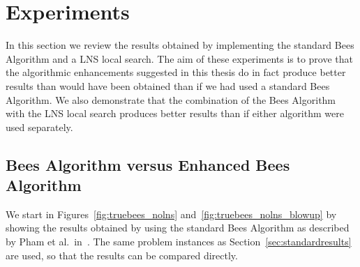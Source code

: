 \section{Experiments}
\label{sec:experiments}

In this section we review the results obtained by implementing the standard Bees Algorithm and a LNS local search. The aim of these experiments is to prove that the algorithmic enhancements suggested in this thesis do in fact produce better results than would have been obtained than if we had used a standard Bees Algorithm. We also demonstrate that the combination of the Bees Algorithm with the LNS local search produces better results than if either algorithm were used separately.

\subsection{Bees Algorithm versus Enhanced Bees Algorithm}
\label{subsec:bavebs}

We start in Figures~\ref{fig:truebees_nolns} and~\ref{fig:truebees_nolns_blowup} by showing the results obtained by using the standard Bees Algorithm as described by Pham et al.~in~\cite{PGKORZ:2005}. The same problem instances as Section~\ref{sec:standardresults} are used, so that the results can be compared directly.



